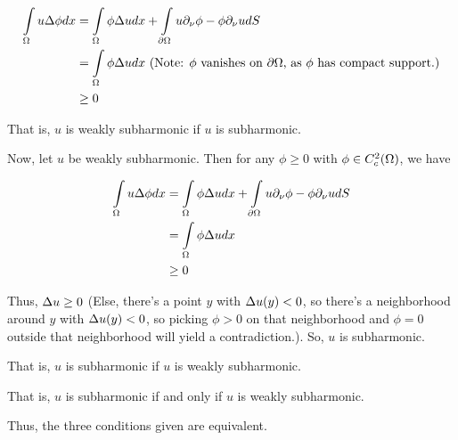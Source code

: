\documentclass[a4paper,12pt]{article}
\begin{document}
\begin{align*}
\int\limits_{\Omega} u \Delta \phi dx &= \int\limits_{\Omega} \phi \Delta u dx + \int\limits_{\partial \Omega} u \partial_{\nu} \phi - \phi \partial_{\nu} u dS \\
&= \int\limits_{\Omega} \phi \Delta u dx \text{ (Note: $\phi$ vanishes on $\partial \Omega$, as $\phi$ has compact support.)} \\
&\geq 0 \\
\end{align*}

That is, $u$ is weakly subharmonic if $u$ is subharmonic.

Now, let $u$ be weakly subharmonic. Then for any $\phi \geq 0$ with $\phi \in C^2_c(\Omega)$, we have

\begin{align*}
\int\limits_{\Omega} u \Delta \phi dx &= \int\limits_{\Omega} \phi \Delta u dx + \int\limits_{\partial \Omega} u \partial_{\nu} \phi - \phi \partial_{\nu} u dS \\
&= \int\limits_{\Omega} \phi \Delta u dx \\
&\geq 0
\end{align*}

Thus, $\Delta u \geq 0$ (Else, there's a point $y$ with $\Delta u(y) < 0$, so there's a neighborhood around $y$ with $\Delta u(y) < 0$, so picking $\phi >0$ on that neighborhood and $\phi = 0$ outside that neighborhood will yield a contradiction.). So, $u$ is subharmonic.

That is, $u$ is subharmonic if $u$ is weakly subharmonic.

That is, $u$ is subharmonic if and only if $u$ is weakly subharmonic.

Thus, the three conditions given are equivalent.

\shunt
\end{document}
